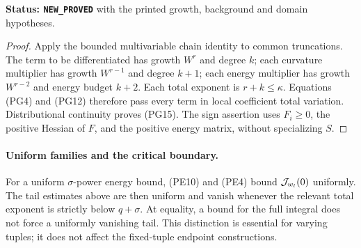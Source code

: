 \noindent\textbf{Status: \texttt{NEW\_PROVED}} with the
printed growth, background and domain hypotheses.

\begin{proof}
Apply the bounded multivariable chain identity to common
truncations. The term to be differentiated has growth $W^r$
and degree $k$; each curvature multiplier has growth
$W^{r-1}$ and degree $k+1$; each energy multiplier has growth
$W^{r-2}$ and energy budget $k+2$. Each total exponent is
$r+k\leq\kappa$. Equations (PG4) and (PG12) therefore pass
every term in local coefficient total variation.
Distributional continuity proves (PG15). The sign assertion
uses $F_i\geq0$, the positive Hessian of $F$, and the positive
energy matrix, without specializing $S$.
\end{proof}

\paragraph{Uniform families and the critical boundary.}
For a uniform $\sigma$-power energy bound, (PE10) and (PE4)
bound $ {\cal J}_{w_l}(0)$ uniformly. The tail estimates above
are then uniform and vanish whenever the relevant total
exponent is strictly below $q+\sigma$. At equality, a bound
for the full integral does not force a uniformly vanishing
tail. This distinction is essential for varying tuples;
it does not affect the fixed-tuple endpoint constructions.
